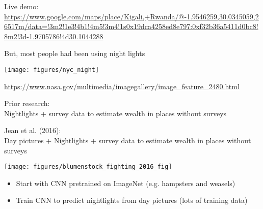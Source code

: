 \documentclass[aspectratio=169]{beamer}
\begin{document}
\begin{frame}

Live demo:
\url{https://www.google.com/maps/place/Kigali,+Rwanda/@-1.9546259,30.0345059,26517m/data=!3m2!1e3!4b1!4m5!3m4!1s0x19dca4258ed8e797:0xf32b36a5411d0bc8!8m2!3d-1.9705786!4d30.1044288}

\end{frame}
\begin{frame}

But, most people had been using night lights
\begin{center}
\texttt{[image: figures/nyc\_night]}
\end{center}

\vfill
\url{https://www.nasa.gov/multimedia/imagegallery/image_feature_2480.html}
\end{frame}
\begin{frame}

Prior research:\\
Nightlights + survey data to estimate wealth in places without surveys

\end{frame}
\begin{frame}

Jean et al. (2016):\\
Day pictures + Nightlights + survey data to estimate wealth in places without surveys

\end{frame}
\begin{frame}

\begin{center}
\texttt{[image: figures/blumenstock\_fighting\_2016\_fig]}
\end{center}

\begin{itemize}
\item Start with CNN pretrained on ImageNet (e.g. hampsters and weasels)
\pause
\item Train CNN to predict nightlights from day pictures (lots of training data)
\end{itemize}

\end{frame}
\end{document}
